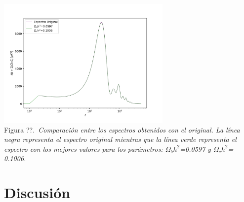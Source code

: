 \documentclass[twocolumn,letterpaper,spanish]{revtex4}
\numberwithin{equation}{section}
\begin{document}
\begin{center}
   \includegraphics[width=85mm]{comparacion2.png}\\
   Figura ??.\emph{\ Comparaci\'on entre los espectros obtenidos con el original. La l\'inea negra representa el espectro original mientras que la l\'inea verde representa el espectro con los mejores valores para los par\'ametros: $\Omega_b h^2$=0.0597 y $\Omega_c h^2$= 0.1006.}
\end{center}



\section{Discusi\'on}\label{discusion}




\end{document}
